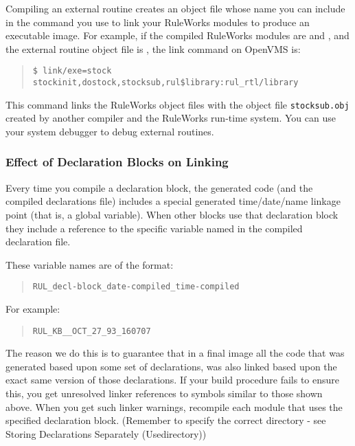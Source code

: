 Compiling an external routine creates an object file
whose name you can include in the command you use to link
your RuleWorks modules to produce an executable image.
For example, if the compiled RuleWorks modules are
 and , and the external routine
object file is , the link command on OpenVMS
is:

\begin{quote}
\begin{verbatim}
$ link/exe=stock stockinit,dostock,stocksub,rul$library:rul_rtl/library
\end{verbatim}
\end{quote}  

This command links the RuleWorks object files with the object file
\verb|stocksub.obj| created by another compiler and the RuleWorks
run-time system. You can use your system debugger to debug external
routines.

\subsubsection{Effect of Declaration Blocks on Linking}

Every time you compile a declaration block, the generated code (and
the  compiled declarations file) includes a special generated
time/date/name linkage point (that is, a global variable). When other
blocks use that declaration block they include a reference to the
specific variable named in the compiled declaration file.

These variable names are of the format:

\begin{quote}
\begin{verbatim}
RUL_decl-block_date-compiled_time-compiled
\end{verbatim}
\end{quote}

For example:

\begin{quote}
\begin{verbatim}
RUL_KB__OCT_27_93_160707
\end{verbatim}
\end{quote}  

The reason we do this is to guarantee that in a final image all the
code that was generated based upon some set of declarations, was also
linked based upon the exact same version of those declarations. If
your build procedure fails to ensure this, you get unresolved linker
references to symbols similar to those shown above. When you get such
linker warnings, recompile each module that uses the specified
declaration block. (Remember to specify the correct directory - see
Storing Declarations Separately (Usedirectory))

